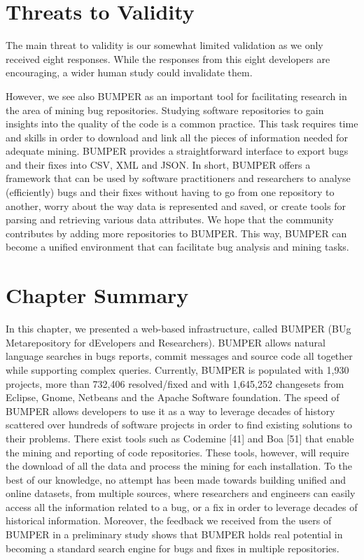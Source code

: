 \documentclass[12pt]{report}
\begin{document}
\section{Threats to Validity}\label{threats-to-validity}

The main threat to validity is our somewhat limited validation as we
only received eight responses. While the responses from this eight
developers are encouraging, a wider human study could invalidate them.

However, we see also BUMPER as an important tool for facilitating
research in the area of mining bug repositories. Studying software
repositories to gain insights into the quality of the code is a common
practice. This task requires time and skills in order to download and
link all the pieces of information needed for adequate mining. BUMPER
provides a straightforward interface to export bugs and their fixes into
CSV, XML and JSON. In short, BUMPER offers a framework that can be used
by software practitioners and researchers to analyse (efficiently) bugs
and their fixes without having to go from one repository to another,
worry about the way data is represented and saved, or create tools for
parsing and retrieving various data attributes. We hope that the
community contributes by adding more repositories to BUMPER. This way,
BUMPER can become a unified environment that can facilitate bug analysis
and mining tasks.

\section{Chapter Summary}\label{chapter-summary}

In this chapter, we presented a web-based infrastructure, called BUMPER
(BUg Metarepository for dEvelopers and Researchers). BUMPER allows
natural language searches in bugs reports, commit messages and source
code all together while supporting complex queries. Currently, BUMPER is
populated with 1,930 projects, more than 732,406 resolved/fixed and with
1,645,252 changesets from Eclipse, Gnome, Netbeans and the Apache
Software foundation. The speed of BUMPER allows developers to use it as
a way to leverage decades of history scattered over hundreds of software
projects in order to find existing solutions to their problems. There
exist tools such as Codemine {[}41{]} and Boa {[}51{]} that enable the
mining and reporting of code repositories. These tools, however, will
require the download of all the data and process the mining for each
installation. To the best of our knowledge, no attempt has been made
towards building unified and online datasets, from multiple sources,
where researchers and engineers can easily access all the information
related to a bug, or a fix in order to leverage decades of historical
information. Moreover, the feedback we received from the users of BUMPER
in a preliminary study shows that BUMPER holds real potential in
becoming a standard search engine for bugs and fixes in multiple
repositories.
\end{document}

